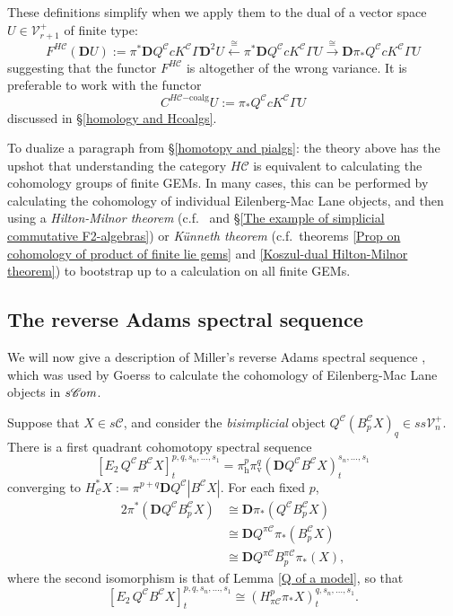 \documentclass[11pt]{amsart} \renewcommand{\baselinestretch}{1.2}
\theoremstyle{plain}
\numberwithin{equation}{section} %
\theoremstyle{plain}
\numberwithin{equation}{chapter} %
\renewcommand{\to}{\longrightarrow}
\newcommand{\from}{\longleftarrow}
\newcommand{\scrC}{\mathscr{C}}
\newcommand{\calC}{\mathcal{C}}
\newcommand{\calV}{\mathcal{V}}
\newcommand{\calc}{\mathcal{C}}
\newcommand{\citeBOX}[2][]{\cite[\mbox{#1}]{#2}}
\newcommand{\vect}[2]{\calV^{#1}_{#2}}
\newcommand{\PA}[1]{\pi#1}
\newcommand{\HA}[1]{H#1}
\newcommand{\HC}[1]{H#1\mathrm{-coalg}}
\newcommand{\algs}{{\scrC\!\textit{\normalfont\textit{om}}}}
\newcommand{\Edown}[4]{[E_{#1}#2]^{#3}_{#4}}
\newcommand{\uver}{^\mathrm{v}}
\newcommand{\dver}{_\mathrm{v}}
\newcommand{\dhor}{_\mathrm{h}}
\newcommand{\diag}[1]{|#1|}
\newcommand{\dual}{\mathbf{D}}
\newcommand{\SubsectionOrSection}[1]{\subsection{#1}}
\begin{document}
\begin{Pi-algebras and cohomology algebras}
These definitions simplify when we apply them to the dual of a vector space $U\in\vect{+}{r+1}$ of finite type:
\[F^{\HA{\calc}}(\dual U):= \pi^*\dual Q^{\calc}cK^\calc\Gamma \dual^{2}U\overset{\cong}{\from}\pi^*\dual Q^{\calc}cK^\calc\Gamma U\overset{\cong}{\to} \dual  \pi_*Q^{\calc}cK^\calc\Gamma U\]
suggesting that the functor $F^{\HA{\calc}}$ is altogether of the wrong variance. It is preferable to work with the functor
\[C^{\HC{\calc}}U:=\pi_*Q^{\calc}cK^\calc\Gamma U\]
discussed in \S\ref{homology and Hcoalgs}.



To dualize a paragraph from \S\ref{homotopy and pialgs}: the theory above has the upshot that understanding the category $\HA{\calc}$ is equivalent to calculating the cohomology groups of finite GEMs. In many cases, this can be performed by calculating the cohomology of individual Eilenberg-Mac Lane objects, and then using a \emph{Hilton-Milnor theorem} (c.f.\ \citeBOX[\S11]{MR1089001} and \S\ref{The example of simplicial commutative F2-algebras}) or \emph{K\"unneth theorem} (c.f.\ theorems \ref{Prop on cohomology of product of finite lie gems} and \ref{Koszul-dual Hilton-Milnor theorem}) to bootstrap up to a calculation on all finite GEMs.

\SubsectionOrSection{The reverse Adams spectral sequence}
\label{reverse Adams spectral sequence}
We will now give a description of Miller's reverse Adams spectral sequence \citeBOX[\S4]{MillerSullivanConjecture.pdf}, which was used by Goerss \cite[Chapter V]{MR1089001} to calculate the cohomology of Eilenberg-Mac Lane objects in $s\algs$.

Suppose that $X\in s\calC$, and consider the \emph{bisimplicial} object $Q^{\calc}(B^{\calc}_pX)_{q}\in ss\vect{+}{n}$. There is a first quadrant cohomotopy spectral sequence
\[\Edown{2}{\,Q^{\calc}B^{\calc}X}{p,q,s_n,\ldots,s_1}{t}=\pi\dhor^{p}\pi\dver^{q}(\dual Q^{\calc}B^{\calc}X)^{s_n,\ldots,s_1}_{t}\]
converging to $H^*_{\calc}X:=\pi^{p+q}\dual Q^{\calc}\diag{B^{\calc}X}$. For each fixed $p$, %
\begin{alignat*}{2}
\pi^{*}(\dual Q^{\calc}B^{\calc}_p X)&\cong\dual \pi_{*}(Q^{\calc}B^{\calc}_p X)\\
&\cong\dual Q^{\PA{\calc}}\pi_{*}(B^{\calc}_p X)\\
&\cong\dual Q^{\PA{\calc}}B^{\PA{\calc}}_p \pi_{*}(X),{}
\end{alignat*}
where the second isomorphism is that of Lemma \ref{Q of a model}, so that 
\[\Edown{2}{\,Q^{\calc}B^{\calc}X}{p,q,s_n,\ldots,s_1}{t}\cong (H^{p}_{\PA{\calc}}\pi_*X)^{q,s_n,\ldots,s_1}_{t}.\]


\end{Pi-algebras and cohomology algebras}
\end{document}
